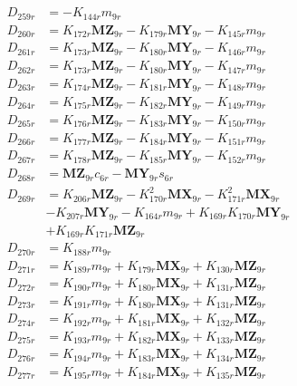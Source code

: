 \begin{align}
 \nonumber \\ 
D_{259r} &= -K_{144r}m_{9r} \nonumber \\
D_{260r} &= K_{172r}\mathbf{MZ}_{9r} - K_{179r}\mathbf{MY}_{9r} - K_{145r}m_{9r} \nonumber \\
D_{261r} &= K_{173r}\mathbf{MZ}_{9r} - K_{180r}\mathbf{MY}_{9r} - K_{146r}m_{9r} \nonumber \\
D_{262r} &= K_{173r}\mathbf{MZ}_{9r} - K_{180r}\mathbf{MY}_{9r} - K_{147r}m_{9r} \nonumber \\
D_{263r} &= K_{174r}\mathbf{MZ}_{9r} - K_{181r}\mathbf{MY}_{9r} - K_{148r}m_{9r} \nonumber \\
D_{264r} &= K_{175r}\mathbf{MZ}_{9r} - K_{182r}\mathbf{MY}_{9r} - K_{149r}m_{9r} \nonumber \\
D_{265r} &= K_{176r}\mathbf{MZ}_{9r} - K_{183r}\mathbf{MY}_{9r} - K_{150r}m_{9r} \nonumber \\
D_{266r} &= K_{177r}\mathbf{MZ}_{9r} - K_{184r}\mathbf{MY}_{9r} - K_{151r}m_{9r} \nonumber \\
D_{267r} &= K_{178r}\mathbf{MZ}_{9r} - K_{185r}\mathbf{MY}_{9r} - K_{152r}m_{9r} \nonumber \\
D_{268r} &= \mathbf{MZ}_{9r}c_{6r} - \mathbf{MY}_{9r}s_{6r} \nonumber \\
D_{269r} &= K_{206r}\mathbf{MZ}_{9r} - K_{170r}^2\mathbf{MX}_{9r} - K_{171r}^2\mathbf{MX}_{9r}  \nonumber \\
&- K_{207r}\mathbf{MY}_{9r} - K_{164r}m_{9r} + K_{169r}K_{170r}\mathbf{MY}_{9r}  \nonumber \\
&+ K_{169r}K_{171r}\mathbf{MZ}_{9r} \nonumber \\
D_{270r} &= K_{188r}m_{9r} \nonumber \\
D_{271r} &= K_{189r}m_{9r} + K_{179r}\mathbf{MX}_{9r} + K_{130r}\mathbf{MZ}_{9r} \nonumber \\
D_{272r} &= K_{190r}m_{9r} + K_{180r}\mathbf{MX}_{9r} + K_{131r}\mathbf{MZ}_{9r} \nonumber \\
D_{273r} &= K_{191r}m_{9r} + K_{180r}\mathbf{MX}_{9r} + K_{131r}\mathbf{MZ}_{9r} \nonumber \\
D_{274r} &= K_{192r}m_{9r} + K_{181r}\mathbf{MX}_{9r} + K_{132r}\mathbf{MZ}_{9r} \nonumber \\
D_{275r} &= K_{193r}m_{9r} + K_{182r}\mathbf{MX}_{9r} + K_{133r}\mathbf{MZ}_{9r} \nonumber \\
D_{276r} &= K_{194r}m_{9r} + K_{183r}\mathbf{MX}_{9r} + K_{134r}\mathbf{MZ}_{9r} \nonumber \\
D_{277r} &= K_{195r}m_{9r} + K_{184r}\mathbf{MX}_{9r} + K_{135r}\mathbf{MZ}_{9r} \nonumber \\

\end{align}
